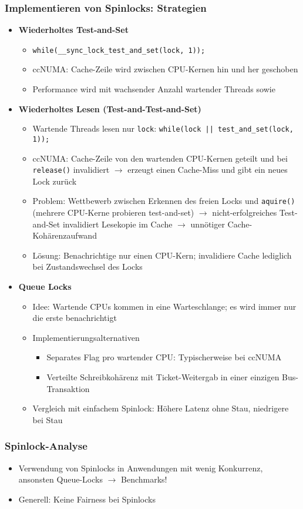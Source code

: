 \subsubsection{Implementieren von Spinlocks: Strategien}
\begin{itemize}
	\item \textbf{Wiederholtes Test-and-Set}
	\begin{itemize}
		\item \texttt{while(\_\_sync\_lock\_test\_and\_set(lock, 1));}
		\item ccNUMA: Cache-Zeile wird zwischen CPU-Kernen hin und her geschoben
		\item Performance wird mit wachsender Anzahl wartender Threads sowie 
	\end{itemize}
	\item \textbf{Wiederholtes Lesen (Test-and-Test-and-Set)}
	\begin{itemize}
		\item Wartende Threads lesen nur \texttt{lock}: \texttt{while(lock || test\_and\_set(lock, 1));}
		\item ccNUMA: Cache-Zeile von den wartenden CPU-Kernen geteilt und bei \texttt{release()} invalidiert \(\rightarrow\) erzeugt einen Cache-Miss und gibt ein neues Lock zurück
		\item Problem: Wettbewerb zwischen Erkennen des freien Locks und \texttt{aquire()} (mehrere CPU-Kerne probieren test-and-set) \(\rightarrow\) nicht-erfolgreiches Test-and-Set invalidiert Lesekopie im Cache \(\rightarrow\) unnötiger Cache-Kohärenzaufwand
		\item Lösung: Benachrichtige nur einen CPU-Kern; invalidiere Cache lediglich bei Zustandswechsel des Locks
	\end{itemize}
	\item \textbf{Queue Locks}
	\begin{itemize}
		\item Idee: Wartende CPUs kommen in eine Warteschlange; es wird immer nur die erste benachrichtigt
		\item Implementierungsalternativen
		\begin{itemize}
			\item Separates Flag pro wartender CPU: Typischerweise bei ccNUMA
			\item Verteilte Schreibkohärenz mit Ticket-Weitergab in einer einzigen Bus-Transaktion
		\end{itemize}
		\item Vergleich mit einfachem Spinlock: Höhere Latenz ohne Stau, niedrigere bei Stau
	\end{itemize}
\end{itemize}

\subsubsection{Spinlock-Analyse}
\begin{itemize}
	\item Verwendung von Spinlocks in Anwendungen mit wenig Konkurrenz, ansonsten Queue-Locks \(\rightarrow\) Benchmarks!
	\item Generell: Keine Fairness bei Spinlocks
\end{itemize}
